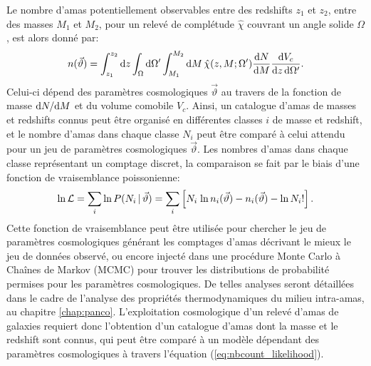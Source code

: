 Le nombre d'amas potentiellement observables entre des redshifts $z_1$ et $z_2$, entre des masses $M_1$ et $M_2$, pour un relevé de complétude $\hat{\chi}$ couvrant un angle solide $\Omega$, est alors donné par:
\begin{equation}
    \label{eq:nbcount_mass}
    n(\vec{\vartheta}) %
    = \int_{z_1}^{z_2} \d z
      \int_\Omega \d\Omega'
      \int_{M_1}^{M_2} \d M \,
        \hat{\chi}(z, M; \Omega') \frac{\d N}{\d M} \frac{\d V_c}{\d z \, \d\Omega'}.
\end{equation}
Celui-ci dépend des paramètres cosmologiques $\vec{\vartheta}$ au travers de la fonction de masse $\mathrm{d} N / \mathrm{d} M$ et du volume comobile $V_c$.
Ainsi, un catalogue d'amas de masses et redshifts connus peut être organisé en différentes classes $i$ de masse et redshift, et le nombre d'amas dans chaque classe $N_i$ peut être comparé à celui attendu pour un jeu de paramètres cosmologiques $\vec{\vartheta}$.
Les nombres d'amas dans chaque classe représentant un comptage discret, la comparaison se fait par le biais d'une fonction de vraisemblance poissonienne:
\begin{equation}
    \label{eq:nbcount_likelihood}
    {\rm ln}\, \mathcal{L}
    = \sum_i {\rm ln}\, P(N_i \,|\, \vec{\vartheta})
    = \sum_i \left[N_i \; {\rm ln}\, n_i(\vec{\vartheta}) - n_i(\vec{\vartheta}) - {\rm ln}\, N_i! \right].
\end{equation}
Cette fonction de vraisemblance peut être utilisée pour chercher le jeu de paramètres cosmologiques générant les comptages d'amas décrivant le mieux le jeu de données observé, ou encore injecté dans une procédure Monte Carlo à Chaînes de Markov (MCMC) pour trouver les distributions de probabilité permises pour les paramètres cosmologiques.
De telles analyses seront détaillées dans le cadre de l'analyse des propriétés thermodynamiques du milieu intra-amas, au chapitre \ref{chap:panco}.
L'exploitation cosmologique d'un relevé d'amas de galaxies requiert donc l'obtention d'un catalogue d'amas dont la masse et le redshift sont connus, qui peut être comparé à un modèle dépendant des paramètres cosmologiques à travers l'équation (\ref{eq:nbcount_likelihood}).

